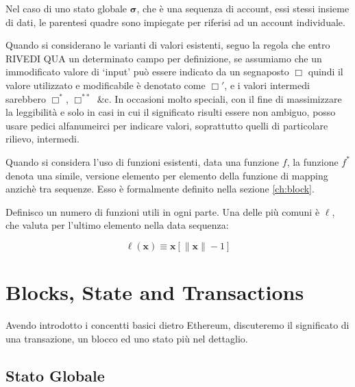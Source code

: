\documentclass[9pt,oneside]{amsart}
\begin{document}
\begin{multicols}{2}
Nel caso di uno stato globale $\boldsymbol{\sigma}$, che è una sequenza di account, essi stessi insieme di dati, le parentesi quadre sono impiegate per riferisi ad un account individuale.

Quando si considerano le varianti di valori esistenti, seguo la regola che entro RIVEDI QUA un determinato campo per definizione, se assumiamo che un immodificato valore di `input' può essere indicato da un segnaposto $\Box$ quindi il valore utilizzato e modificabile è denotato come $\Box'$, e i valori intermedi sarebbero $\Box^*$,  $\Box^{**}$ \&c. In occasioni molto speciali, con il fine di massimizzare la leggibilità e solo in casi in cui il significato risulti essere non ambiguo, posso usare pedici alfanumeirci per indicare valori, soprattutto quelli di particolare rilievo, intermedi.

Quando si considera l'uso di funzioni esistenti, data una funzione $f$, la funzione $f^*$ denota una simile, versione elemento per elemento della funzione di mapping anzichè tra sequenze. Esso è formalmente definito nella sezione \ref{ch:block}.

Definisco un numero di funzioni utili in ogni parte. Una delle più comuni è $\ell$, che valuta per l'ultimo elemento nella data sequenza:

\begin{equation}
\ell(\mathbf{x}) \equiv \mathbf{x}[\lVert \mathbf{x} \rVert - 1]
\end{equation}

\section{Blocks, State and Transactions} \label{ch:bst}

Avendo introdotto i concentti basici dietro Ethereum, discuteremo il significato di una transazione, un blocco ed uno stato più nel dettaglio.

\subsection{Stato Globale} \label{ch:state}


\end{multicols}
\end{document}

